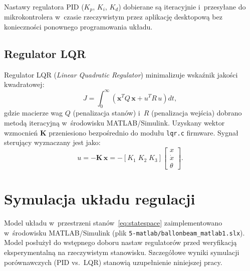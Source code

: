 Nastawy regulatora PID ($K_p$, $K_i$, $K_d$) dobierane są iteracyjnie
i~przesyłane do mikrokontrolera w~czasie rzeczywistym przez aplikację
desktopową bez konieczności ponownego programowania układu.

\subsection{Regulator LQR}

Regulator LQR (\textit{Linear Quadratic Regulator}) minimalizuje wskaźnik
jakości kwadratowej:
\begin{equation}
  J = \int_0^\infty \left( \mathbf{x}^T Q\,\mathbf{x} + u^T R\,u \right) dt,
\end{equation}
gdzie macierze wag $Q$ (penalizacja stanów) i~$R$ (penalizacja wejścia)
dobrano metodą iteracyjną w~środowisku MATLAB/Simulink.
Uzyskany wektor wzmocnień $\mathbf{K}$ przeniesiono bezpośrednio do modułu
\texttt{lqr.c} firmware.
Sygnał sterujący wyznaczany jest jako:
\begin{equation}
  u = -\mathbf{K}\,\mathbf{x} = -[K_1\;K_2\;K_3]\begin{bmatrix} x \\ \dot{x} \\ \theta \end{bmatrix}.
\end{equation}

\section{Symulacja układu regulacji}

Model układu w~przestrzeni stanów~\eqref{eq:statespace} zaimplementowano
w~środowisku MATLAB/Simulink (plik \texttt{5-matlab/ballonbeam\_matlab1.slx}).
Model posłużył do wstępnego doboru nastaw regulatorów przed weryfikacją
eksperymentalną na rzeczywistym stanowisku.
Szczegółowe wyniki symulacji porównawczych (PID vs.\ LQR) stanowią
uzupełnienie niniejszej pracy.
